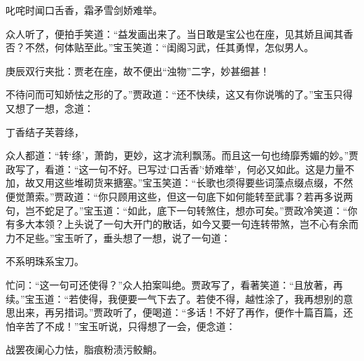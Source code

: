 \begin{poem}
    \begin{pl}
        叱咤时闻口舌香，霜矛雪剑娇难举。
    \end{pl}
\end{poem}


\begin{parag}
    众人听了，便拍手笑道：“益发画出来了。当日敢是宝公也在座，见其娇且闻其香否？不然，何体贴至此。”宝玉笑道：“闺阁习武，任其勇悍，怎似男人。\begin{note}庚辰双行夹批：贾老在座，故不便出“浊物”二字，妙甚细甚！\end{note}不待问而可知娇怯之形的了。”贾政道：“还不快续，这又有你说嘴的了。”宝玉只得又想了一想，念道：
\end{parag}


\begin{poem}
    \begin{pl}
        丁香结子芙蓉绦，
    \end{pl}
\end{poem}

\begin{parag}
    众人都道：“转‘绦’，萧韵，更妙，这才流利飘荡。而且这一句也绮靡秀媚的妙。”贾政写了，看道：“这一句不好。已写过‘口舌香’‘娇难举’，何必又如此。这是力量不加，故又用这些堆砌货来搪塞。”宝玉笑道：“长歌也须得要些词藻点缀点缀，不然便觉萧索。”贾政道：“你只顾用这些，但这一句底下如何能转至武事？若再多说两句，岂不蛇足了。”宝玉道：“如此，底下一句转煞住，想亦可矣。”贾政冷笑道：“你有多大本领？上头说了一句大开门的散话，如今又要一句连转带煞，岂不心有余而力不足些。”宝玉听了，垂头想了一想，说了一句道：
\end{parag}


\begin{poem}
    \begin{pl}
        不系明珠系宝刀。
    \end{pl}
\end{poem}

\begin{parag}
    忙问：“这一句可还使得？”众人拍案叫绝。贾政写了，看著笑道：“且放著，再续。”宝玉道：“若使得，我便要一气下去了。若使不得，越性涂了，我再想别的意思出来，再另措词。”贾政听了，便喝道：“多话！不好了再作，便作十篇百篇，还怕辛苦了不成！”宝玉听说，只得想了一会，便念道：
\end{parag}


\begin{poem}
    \begin{pl}
        战罢夜阑心力怯，脂痕粉渍污鲛鮹。
    \end{pl}
\end{poem}


